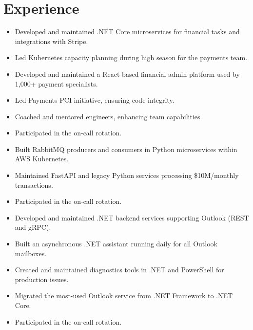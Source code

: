\documentclass[10pt, a4paper, roman]{moderncv} %
\begin{document}
\makecvtitle %
\vspace{-1.25cm}

\section{Experience}

{
    \begin{itemize}
        \item Developed and maintained .NET Core microservices for financial tasks and integrations with Stripe.
        \item Led Kubernetes capacity planning during high season for the payments team.
        \item Developed and maintained a React-based financial admin platform used by 1,000+ payment specialists.
        \item Led Payments PCI initiative, ensuring code integrity.
        \item Coached and mentored engineers, enhancing team capabilities.
        \item Participated in the on-call rotation.
    \end{itemize}
}

{
    \begin{itemize}
        \item Built RabbitMQ producers and consumers in Python microservices within AWS Kubernetes.
        \item Maintained FastAPI and legacy Python services processing \$10M/monthly transactions.
        \item Participated in the on-call rotation.
    \end{itemize}
}

{
    \begin{itemize}
        \item Developed and maintained .NET backend services supporting Outlook (REST and gRPC).
        \item Built an asynchronous .NET assistant running daily for all Outlook mailboxes.
        \item Created and maintained diagnostics tools in .NET and PowerShell for production issues.
        \item Migrated the most-used Outlook service from .NET Framework to .NET Core.
        \item Participated in the on-call rotation.
    \end{itemize}
}
\end{document}
